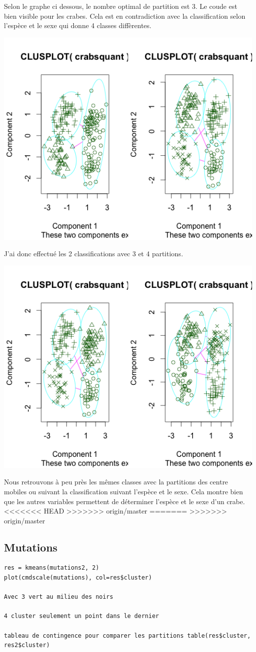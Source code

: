 \documentclass{article}\usepackage[]{graphicx}\usepackage[]{color}
\begin{document}
Selon le graphe ci dessous, le nombre optimal de partition est 3. Le coude est bien visible pour les crabes. Cela est en contradiction avec la classification selon l'espèce et le sexe qui donne 4 classes diffèrentes.  


\includegraphics[width=\textwidth]{ex2_crab_3.png}

J'ai donc effectué les 2 classifications avec 3 et 4 partitions. 

\includegraphics[width=\textwidth]{ex2_crab_4.png}

Nous retrouvons à peu près les mêmes classes avec la partitions des centre mobiles ou suivant la classification suivant l'espèce et le sexe. Cela montre bien que les autres variables permettent de déterminer l'espèce et le sexe d'un crabe. 
<<<<<<< HEAD
>>>>>>> origin/master
=======
>>>>>>> origin/master

\subsection*{Mutations}
\begin{verbatim}
res = kmeans(mutations2, 2)
plot(cmdscale(mutations), col=res$cluster)

Avec 3 vert au milieu des noirs 

4 cluster seulement un point dans le dernier

tableau de contingence pour comparer les partitions table(res$cluster, res2$cluster)
\end{verbatim}
\end{document}
